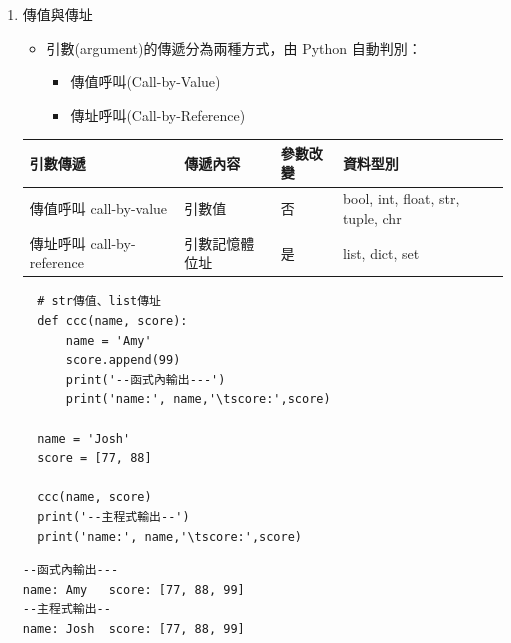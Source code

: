 \documentclass[a4paper,12pt]{article}
\begin{document}
\begin{enumerate}
\item 傳值與傳址
\label{sec:orga4e3b24}
\begin{itemize}
\item 引數(argument)的傳遞分為兩種方式，由 Python 自動判別：\\
\begin{itemize}
\item 傳值呼叫(Call-by-Value)\\
\item 傳址呼叫(Call-by-Reference)\\
\end{itemize}
\end{itemize}
\begin{center}
\begin{tabular}{llll}
引數傳遞 & 傳遞內容 & 參數改變 & 資料型別\\
\hline
傳值呼叫 call-by-value & 引數值 & 否 & bool, int, float, str, tuple, chr\\
傳址呼叫 call-by-reference & 引數記憶體位址 & 是 & list, dict, set\\
\end{tabular}
\end{center}
\lstset{breaklines=true,language=Python,label= ,caption= ,captionpos=b,firstnumber=1,numbers=left}
\begin{lstlisting}
  # str傳值、list傳址
  def ccc(name, score):
      name = 'Amy'
      score.append(99)
      print('--函式內輸出---')
      print('name:', name,'\tscore:',score)

  name = 'Josh'
  score = [77, 88]
  
  ccc(name, score)
  print('--主程式輸出--')
  print('name:', name,'\tscore:',score)
\end{lstlisting}

\begin{verbatim}
--函式內輸出---
name: Amy 	score: [77, 88, 99]
--主程式輸出--
name: Josh 	score: [77, 88, 99]
\end{verbatim}
\end{enumerate}
\end{document}
